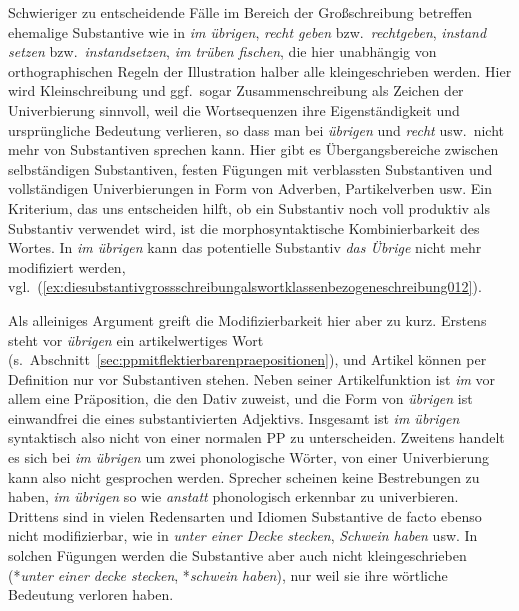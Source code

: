 Schwieriger zu entscheidende Fälle im Bereich der Großschreibung betreffen ehemalige Substantive wie in \textit{im übrigen}, \textit{recht geben} bzw.\ \textit{rechtgeben}, \textit{instand setzen} bzw.\ \textit{instandsetzen}, \textit{im trüben fischen}, die hier unabhängig von orthographischen Regeln der Illustration halber alle kleingeschrieben werden.
Hier wird Kleinschreibung und ggf.\ sogar Zusammenschreibung als Zeichen der Univerbierung sinnvoll, weil die Wortsequenzen ihre Eigenständigkeit und ursprüngliche Bedeutung verlieren, so dass man bei \textit{übrigen} und \textit{recht} usw.\ nicht mehr von Substantiven sprechen kann.
Hier gibt es Übergangsbereiche zwischen selbständigen Substantiven, festen Fügungen mit verblassten Substantiven und vollständigen Univerbierungen in Form von Adverben, Partikelverben usw.
Ein Kriterium, das uns entscheiden hilft, ob ein Substantiv noch voll produktiv als Substantiv verwendet wird, ist die morphosyntaktische Kombinierbarkeit des Wortes.
In \textit{im übrigen} kann \zB das potentielle Substantiv \textit{das Übrige} \zB nicht mehr modifiziert werden, vgl.\ (\ref{ex:diesubstantivgrossschreibungalswortklassenbezogeneschreibung012}).

\begin{exe}
  \ex\label{ex:diesubstantivgrossschreibungalswortklassenbezogeneschreibung012}
  \begin{xlist}
  \end{xlist}
\end{exe}

Als alleiniges Argument greift die Modifizierbarkeit hier aber zu kurz.
Erstens steht vor \textit{übrigen} ein artikelwertiges Wort (s.\ Abschnitt~\ref{sec:ppmitflektierbarenpraepositionen}), und Artikel können per Definition nur vor Substantiven stehen.
Neben seiner Artikelfunktion ist \textit{im} vor allem eine Präposition, die den Dativ zuweist, und die Form von \textit{übrigen} ist einwandfrei die eines substantivierten Adjektivs.
Insgesamt ist \textit{im übrigen} syntaktisch also nicht von einer normalen PP zu unterscheiden.
Zweitens handelt es sich bei \textit{im übrigen} um zwei phonologische Wörter, von einer Univerbierung kann also nicht gesprochen werden.
Sprecher scheinen keine Bestrebungen zu haben, \textit{im übrigen} so wie \textit{anstatt} phonologisch erkennbar zu univerbieren.
Drittens sind in vielen Redensarten und Idiomen Substantive de facto ebenso nicht modifizierbar, wie \zB in \textit{unter einer Decke stecken}, \textit{Schwein haben} usw.
In solchen Fügungen werden die Substantive aber auch nicht kleingeschrieben (*\textit{unter einer decke stecken}, *\textit{schwein haben}), nur weil sie ihre wörtliche Bedeutung verloren haben.

